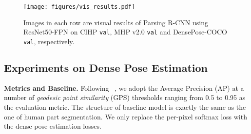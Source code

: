 \documentclass[10pt,twocolumn,letterpaper]{article}
\begin{document}
\begin{table}[t]
\centering
\small
{}
\vspace{.5em}
  \caption{2018 COCO Challenge results of Dense Pose Estimation task on \texttt{test}.}
  \label{tab:coco2018_densepose}
\vspace{-.8em}
\end{table}



\begin{figure*}
\begin{center}
\texttt{[image: figures/vis\_results.pdf]}
\end{center}
\vspace{-1mm}
\caption{Images in each row are visual results of Parsing R-CNN using ResNet50-FPN on CIHP \texttt{val}, MHP v2.0 \texttt{val} and DensePose-COCO \texttt{val}, respectively.}
\label{fig:vis_results}
\end{figure*}


\subsection{Experiments on Dense Pose Estimation} 
\vspace{6pt}
\noindent\textbf{Metrics and Baseline.} Following ~\cite{Guler_cvpr2018_densepose}, we adopt the Average Precision (AP) at a number of \emph{geodesic point similarity} (GPS) thresholds ranging from 0.5 to 0.95 as the evaluation metric. The structure of baseline model is exactly the same as the one of human part segmentation. We only replace the per-pixel softmax loss with the dense pose estimation losses.
\end{document}
